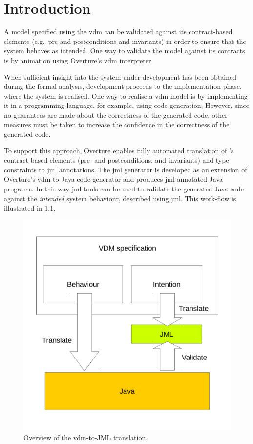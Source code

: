 
\chapter{Introduction}

A model specified using the \ac{vdm} can be validated against its
contract-based elements (e.g.\ pre and postconditions and invariants)
in order to ensure that the system behaves as intended. One way to
validate the model against its contracts is by animation using
Overture's \ac{vdm} interpreter.

When sufficient insight into the system under development has been
obtained during the formal analysis, development proceeds to the
implementation phase, where the system is realised. One way to realise
a \ac{vdm} model is by implementing it in a programming language, for
example, using code generation. However, since no guarantees are made
about the correctness of the generated code, other measures must be
taken to increase the confidence in the correctness of the generated
code.

To support this approach, Overture enables fully automated translation
of \vsl's contract-based elements (pre- and postconditions, and
invariants) and type constraints to \ac{jml} annotations. The \ac{jml}
generator is developed as an extension of Overture's \ac{vdm}-to-Java
code generator and produces \ac{jml} annotated Java programs. In this
way \ac{jml} tools can be used to validate the generated Java code
against the \emph{intended} system behaviour, described using
\ac{jml}. This work-flow is illustrated in
\cref{fig:vdm2jml-overview}.

\begin{figure}[!ht]
  \centering
  \includegraphics[width=0.6\linewidth]{figs/vdm2jml}
  \caption {Overview of the \ac{vdm}-to-JML translation.}
  \label{fig:vdm2jml-overview}
\end{figure}

